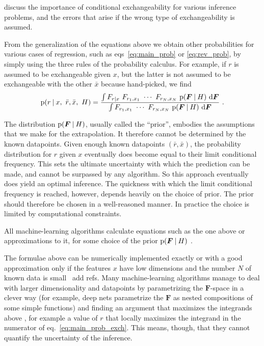 \documentclass[\ifafour a4paper,12pt,\else a5paper,10pt,\fi%
onecolumn,oneside,article,%
british%
]{memoir}
\theoremstyle{remark}
\theoremstyle{innote}
\newcommand*{\di}{\mathrm{d}}%
\newcommand*{\p}{\mathrm{p}}%
\renewcommand*{\|}[1][]{\nonscript\:#1\vert\nonscript\:\mathopen{}}
\renewcommand*{\=}{\TextOrMath\texteq\eq}
\newcommand*{\eqn}{eq.}%
\newcommand*{\eqns}{eqs}%
\newcommand*{\wrench}{{\fontencoding{U}\fontfamily{fontawesomethree}\selectfont\symbol{114}}}
\newcommand{\mynote}[1]{ {\color{notecolour}#1}}
\newcommand*{\ro}{r}
\newcommand*{\xo}{x}
\newcommand*{\br}{\bar{r}}
\newcommand*{\bx}{\bar{x}}
\newcommand*{\yF}{\bm{F}}
\begin{document}
\textcite{lindleyetal1981} discuss the importance of conditional
exchangeability for various inference problems, and the errors that arise
if the wrong type of exchangeability is assumed.

From the generalization of the equations above we obtain other
probabilities for various cases of regression, such as
\eqns~\eqref{eq:main_prob} or \eqref{eq:rev_prob}, by simply using the
three rules of the probability calculus. For example, if $\ro$ is assumed
to be exchangeable given $\xo$, but the latter is not assumed to be
exchangeable with the other $\bx$ because hand-picked, we find
\begin{equation}
  \label{eq:main_prob_exch}
  \p(\ro \| \xo,\ \br,\bx,\ H) =
  \frac{
    \int F_{\ro\|\xo} \ F_{r_{1},x_{1}} \  \dotsm \ 
  F_{r_{N},x_{N}} \ \p(\yF \| H)\ \di\yF
  }{
    \int F_{r_{1},x_{1}} \  \dotsm \ 
  F_{r_{N},x_{N}} \ \p(\yF \| H)\ \di\yF
  } \ .
\end{equation}

The distribution $\p(\yF \| H)$, usually called the \enquote{prior},
embodies the assumptions that we make for the extrapolation. It therefore
cannot be determined by the known datapoints. Given enough known datapoints
$(\br,\bx)$, the probability distribution for $\ro$ given $\xo$
eventually does become equal to their limit conditional frequency. This
sets the ultimate uncertainty with which the prediction can be made, and
cannot be surpassed by any algorithm. So this approach eventually does
yield an optimal inference. The quickness with which the limit conditional
frequency is reached, however, depends heavily on the choice of prior. The
prior should therefore be chosen in a well-reasoned manner. In practice the
choice is limited by computational constraints.

All machine-learning algorithms calculate equations such as the one above
or approximations to it, for some choice of the prior $\p(\yF \| H)$
\parencites{mackay1992,bishop2006}.

The formulae above can be numerically implemented exactly or with a good
approximation only if the features $x$ have low dimensions and the number
$N$ of known data is small \mynote{\wrench\ add refs}. Many
machine-learning algorithms manage to deal with larger dimensionality and
datapoints by parametrizing the $\yF$-space in a clever way (for example,
deep nets parametrize the $\yF$ as nested compositions of some simple
functions) and finding an argument that maximizes the integrands above
\parencites{mackay1992,mackay1992b}, for example a value of $\ro$ that
locally maximizes the integrand in the numerator of
\eqn~\eqref{eq:main_prob_exch}. This means, though, that they cannot
quantify the uncertainty of the inference.
\end{document}

